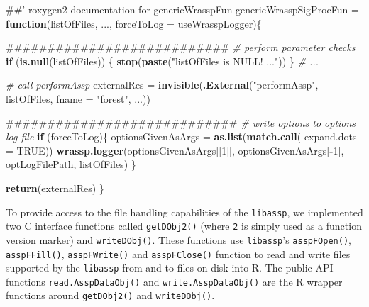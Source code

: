 \documentclass[]{book}
\newenvironment{Shaded}{\begin{snugshade}}{\end{snugshade}}
\newcommand{\CommentTok}[1]{\textcolor[rgb]{0.56,0.35,0.01}{\textit{#1}}}
\newcommand{\ControlFlowTok}[1]{\textcolor[rgb]{0.13,0.29,0.53}{\textbf{#1}}}
\newcommand{\DataTypeTok}[1]{\textcolor[rgb]{0.13,0.29,0.53}{#1}}
\newcommand{\DecValTok}[1]{\textcolor[rgb]{0.00,0.00,0.81}{#1}}
\newcommand{\KeywordTok}[1]{\textcolor[rgb]{0.13,0.29,0.53}{\textbf{#1}}}
\newcommand{\NormalTok}[1]{#1}
\newcommand{\OperatorTok}[1]{\textcolor[rgb]{0.81,0.36,0.00}{\textbf{#1}}}
\newcommand{\OtherTok}[1]{\textcolor[rgb]{0.56,0.35,0.01}{#1}}
\newcommand{\StringTok}[1]{\textcolor[rgb]{0.31,0.60,0.02}{#1}}
\theoremstyle{definition}
\theoremstyle{definition}
\theoremstyle{definition}
\theoremstyle{remark}
\begin{document}
\begin{Shaded}
\begin{Highlighting}[]
\NormalTok{##' roxygen2 documentation for genericWrasspFun}
\NormalTok{genericWrasspSigProcFun =}\StringTok{ }\ControlFlowTok{function}\NormalTok{(listOfFiles,}
\NormalTok{                                   ...,}
                                   \DataTypeTok{forceToLog =}\NormalTok{ useWrasspLogger)\{}
  
\NormalTok{  ###########################}
  \CommentTok{# perform parameter checks}
  \ControlFlowTok{if}\NormalTok{ (}\KeywordTok{is.null}\NormalTok{(listOfFiles)) \{}
        \KeywordTok{stop}\NormalTok{(}\KeywordTok{paste}\NormalTok{(}\StringTok{"listOfFiles is NULL! ..."}\NormalTok{))}
\NormalTok{  \}}
  \CommentTok{# ...}
  
  \CommentTok{# call performAssp}
\NormalTok{  externalRes =}\StringTok{ }\KeywordTok{invisible}\NormalTok{(}\KeywordTok{.External}\NormalTok{(}\StringTok{"performAssp"}\NormalTok{, listOfFiles, }
                                    \DataTypeTok{fname =} \StringTok{"forest"}\NormalTok{, ...))}
  
  
\NormalTok{  ############################}
  \CommentTok{# write options to options log file}
  \ControlFlowTok{if}\NormalTok{ (forceToLog)\{}
\NormalTok{      optionsGivenAsArgs =}\StringTok{ }\KeywordTok{as.list}\NormalTok{(}\KeywordTok{match.call}\NormalTok{(}
        \DataTypeTok{expand.dots =} \OtherTok{TRUE}\NormalTok{))}
      \KeywordTok{wrassp.logger}\NormalTok{(optionsGivenAsArgs[[}\DecValTok{1}\NormalTok{]], }
\NormalTok{                    optionsGivenAsArgs[}\OperatorTok{-}\DecValTok{1}\NormalTok{],}
\NormalTok{                    optLogFilePath, listOfFiles)}
\NormalTok{  \}    }
  
  \KeywordTok{return}\NormalTok{(externalRes)}
\NormalTok{\}}
\end{Highlighting}
\end{Shaded}

To provide access to the file handling capabilities of the
\texttt{libassp}, we implemented two C interface functions called
\texttt{getDObj2()} (where \texttt{2} is simply used as a function
version marker) and \texttt{writeDObj()}. These functions use
\texttt{libassp}'s \texttt{asspFOpen()}, \texttt{asspFFill()},
\texttt{asspFWrite()} and \texttt{asspFClose()} function to read and
write files supported by the \texttt{libassp} from and to files on disk
into R. The public API functions \texttt{read.AsspDataObj()} and
\texttt{write.AsspDataObj()} are the R wrapper functions around
\texttt{getDObj2()} and \texttt{writeDObj()}.
\end{document}
